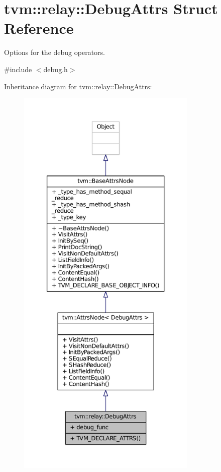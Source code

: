 \hypertarget{structtvm_1_1relay_1_1DebugAttrs}{}\section{tvm\+:\+:relay\+:\+:Debug\+Attrs Struct Reference}
\label{structtvm_1_1relay_1_1DebugAttrs}


Options for the debug operators.  




{\ttfamily \#include $<$debug.\+h$>$}



Inheritance diagram for tvm\+:\+:relay\+:\+:Debug\+Attrs\+:
\nopagebreak
\begin{figure}[H]
\begin{center}
\leavevmode
\includegraphics[height=550pt]{structtvm_1_1relay_1_1DebugAttrs__inherit__graph}
\end{center}
\end{figure}



